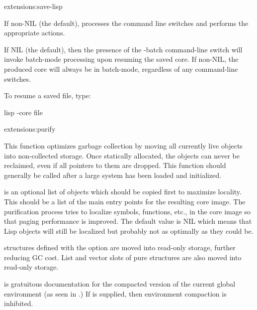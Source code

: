 \begin{defun}{extensions:}{save-lisp}
\begin{Lentry}
  \item[\kwd{process-command-line}] If non-NIL (the default),
    processes the command line switches and performs the appropriate
    actions.

  \item[\kwd{batch-mode}] If NIL (the default), then the presence of
    the -batch command-line switch will invoke batch-mode processing
    upon resuming the saved core.  If non-NIL, the produced core will
    always be in batch-mode, regardless of any command-line switches.
  \end{Lentry}
\end{defun}

To resume a saved file, type:
\begin{example}
lisp -core file
\end{example}

\begin{defun}{extensions:}{purify}{
    }
  
  This function optimizes garbage collection by moving all currently
  live objects into non-collected storage.  Once statically allocated,
  the objects can never be reclaimed, even if all pointers to them are
  dropped.  This function should generally be called after a large
  system has been loaded and initialized.

  \begin{Lentry}
  \item[\kwd{root-structures}] is an optional list of objects which
    should be copied first to maximize locality.  This should be a
    list of the main entry points for the resulting core image.  The
    purification process tries to localize symbols, functions, etc.,
    in the core image so that paging performance is improved.  The
    default value is NIL which means that Lisp objects will still be
    localized but probably not as optimally as they could be.
  
     structures defined with the 
    option are moved into read-only storage, further reducing GC cost.
    List and vector slots of pure structures are also moved into
    read-only storage.
  
  \item[\kwd{environment-name}] is gratuitous documentation for the
    compacted version of the current global environment (as seen in
    .)  If \false{} is supplied, then
    environment compaction is inhibited.
  \end{Lentry}
\end{defun}


